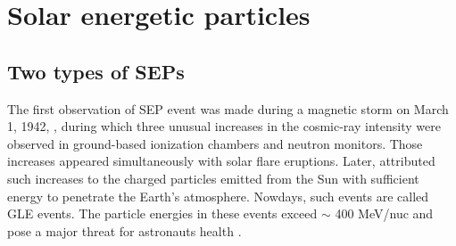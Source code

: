 


\section{Solar energetic particles}

\subsection*{Two types of SEPs}


The first observation of \ac{SEP} event was made during a magnetic storm on March 1, 1942, \citep{lange1942note,forbush1942further}, during which three unusual increases in the cosmic-ray intensity were observed in ground-based ionization chambers and neutron monitors. Those increases appeared simultaneously with solar flare eruptions. Later, \citet{Forbush1946} attributed such increases to the charged particles emitted from the Sun with sufficient energy to penetrate the Earth's atmosphere. Nowdays, such events are called \ac{GLE} events. The particle energies in these events exceed $\sim$ 400 MeV/nuc and pose a major threat for astronauts health \citep{meyer1956solar,Shea2012SSRv,gopalswamy2013first,thakur2014ground, Reames2013, Mironshnichenko2013Ge}.

